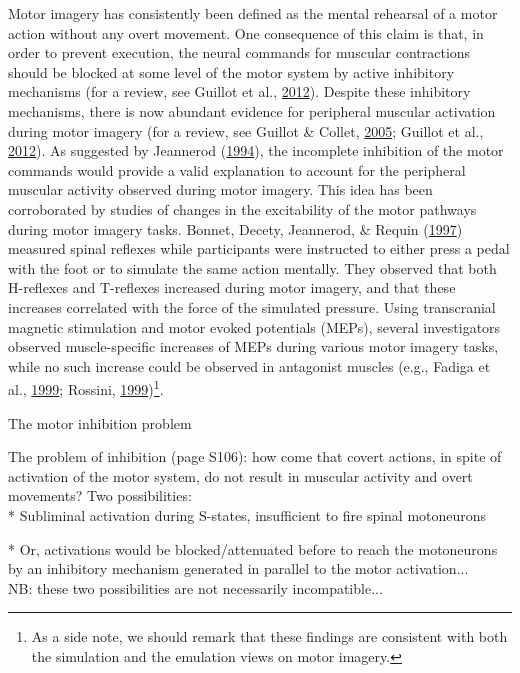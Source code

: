 \documentclass[a4paper,12pt,twoside,openright,oldfontcommands]{memoir}
\let\rmarkdownfootnote\footnote%
\def\footnote{\protect\rmarkdownfootnote}
\begin{document}
Motor imagery has consistently been defined as the mental rehearsal of a motor action without any overt movement. One consequence of this claim is that, in order to prevent execution, the neural commands for muscular contractions should be blocked at some level of the motor system by active inhibitory mechanisms (for a review, see Guillot et al., \protect\hyperlink{ref-guillot_imagining_2012}{2012}). Despite these inhibitory mechanisms, there is now abundant evidence for peripheral muscular activation during motor imagery (for a review, see Guillot \& Collet, \protect\hyperlink{ref-guillot_contribution_2005}{2005}; Guillot et al., \protect\hyperlink{ref-guillot_imagining_2012}{2012}). As suggested by Jeannerod (\protect\hyperlink{ref-jeannerod_representing_1994}{1994}), the incomplete inhibition of the motor commands would provide a valid explanation to account for the peripheral muscular activity observed during motor imagery. This idea has been corroborated by studies of changes in the excitability of the motor pathways during motor imagery tasks. Bonnet, Decety, Jeannerod, \& Requin (\protect\hyperlink{ref-bonnet_mental_1997}{1997}) measured spinal reflexes while participants were instructed to either press a pedal with the foot or to simulate the same action mentally. They observed that both H-reflexes and T-reflexes increased during motor imagery, and that these increases correlated with the force of the simulated pressure. Using transcranial magnetic stimulation and motor evoked potentials (MEPs), several investigators observed muscle-specific increases of MEPs during various motor imagery tasks, while no such increase could be observed in antagonist muscles (e.g., Fadiga et al., \protect\hyperlink{ref-fadiga_corticospinal_1999}{1999}; Rossini, \protect\hyperlink{ref-rossini_corticospinal_1999}{1999})\footnote{As a side note, we should remark that these findings are consistent with both the simulation and the emulation views on motor imagery.}.

\vspace{2mm}

\begin{mybox}[label = inhibition]{The motor inhibition problem}

The problem of inhibition (page S106): how come that covert actions, in spite of activation of the motor system, do not result in muscular activity and overt movements? Two possibilities:\\

*   Subliminal activation during S-states, insufficient to fire spinal motoneurons

*   Or, activations would be blocked/attenuated before to reach the motoneurons by an inhibitory mechanism generated in parallel to the motor activation...\\

NB: these two possibilities are not necessarily incompatible...

\end{mybox}
\end{document}
